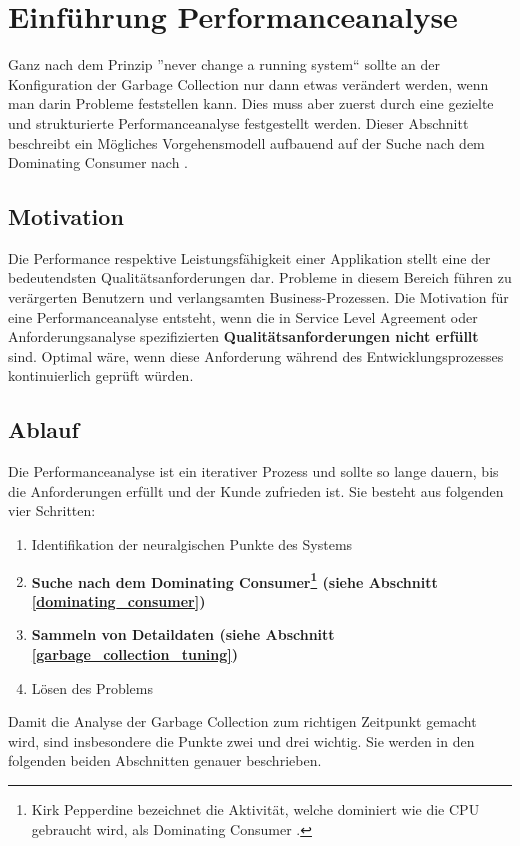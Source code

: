 \chapter{Einführung Performanceanalyse}
Ganz nach dem Prinzip ''never change a running system`` sollte an der Konfiguration der Garbage Collection nur dann etwas verändert werden, wenn man darin Probleme feststellen kann. Dies muss aber zuerst durch eine gezielte und strukturierte Performanceanalyse festgestellt werden. Dieser Abschnitt beschreibt ein Mögliches Vorgehensmodell aufbauend auf der Suche nach dem Dominating Consumer nach \cite{pepperdine201102}.

\section{Motivation}
Die Performance respektive Leistungsfähigkeit einer Applikation stellt eine der bedeutendsten Qualitätsanforderungen dar. Probleme in diesem Bereich führen zu verärgerten Benutzern und verlangsamten Business-Prozessen. Die Motivation für eine Performanceanalyse entsteht, wenn die in Service Level Agreement oder Anforderungsanalyse spezifizierten \textbf{Qualitätsanforderungen nicht erfüllt} sind. Optimal wäre, wenn diese Anforderung während des Entwicklungsprozesses kontinuierlich geprüft würden.

\section{Ablauf}
Die Performanceanalyse ist ein iterativer Prozess und sollte so lange dauern, bis die Anforderungen erfüllt und der Kunde zufrieden ist. Sie besteht aus folgenden vier Schritten\cite{hummelBeer201109}:
\begin{enumerate}
	\item Identifikation der neuralgischen Punkte des Systems
	\item \textbf{Suche nach dem Dominating Consumer\footnote{Kirk Pepperdine bezeichnet die Aktivität, welche dominiert wie die CPU gebraucht wird, als Dominating Consumer . } (siehe Abschnitt \ref{dominating_consumer})}
	\item \textbf{Sammeln von Detaildaten (siehe Abschnitt \ref{garbage_collection_tuning})}
	\item Lösen des Problems
\end{enumerate}


Damit die Analyse der Garbage Collection zum richtigen Zeitpunkt gemacht wird, sind insbesondere die Punkte zwei und drei wichtig. Sie werden in den folgenden beiden Abschnitten genauer beschrieben.
